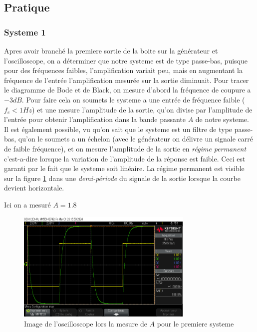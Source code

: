 \documentclass[12pt, a4paper]{report}
\begin{document}
\subsection{Pratique}
\subsubsection{Systeme 1}

Apres avoir branché la premiere sortie de la boite sur la générateur et l'oscilloscope, on a déterminer que
notre systeme est de type passe-bas, puisque pour des fréquences faibles, l'amplification variait peu, mais en augmentant
la fréquence de l'entrée l'amplification mesurée sur la sortie diminuait. Pour tracer le diagramme de 
Bode et de Black, on mesure d'abord la fréquence de coupure a $-3 dB$. Pour faire cela on soumets le systeme a 
une entrée de fréquence faible ($f_e < 1 Hz$) et une mesure l'amplitude de la sortie, qu'on divise par l'amplitude 
de l'entrée pour obtenir l'amplification dans la bande passante $A$ de notre systeme. Il est également possible, 
vu qu'on sait que le systeme est un filtre de type passe-bas, qu'on le soumets a un échelon
(avec le générateur on délivre un signale carré de faible fréquence), et on mesure l'amplitude de  
la sortie en \textit{régime permanent} c'est-a-dire lorsque la variation de l'amplitude de la réponse 
est faible. Ceci est garanti par le fait que le systeme soit linéaire. La régime permanent est visible sur la figure \ref{fig:mesureA1}
dans une \textit{demi-période} du signale de la sortie lorsque la courbe devient horizontale.
\par

\pagebreak

Ici on a mesuré $A = 1.8$

\begin{figure}[h]
    \centering
    \includegraphics[width=0.75\textwidth]{mesureA1.png}
    \caption{Image de l'oscilloscope lors la mesure de $A$ pour le premiere systeme}
    \label{fig:mesureA1}
\end{figure}
\end{document}
